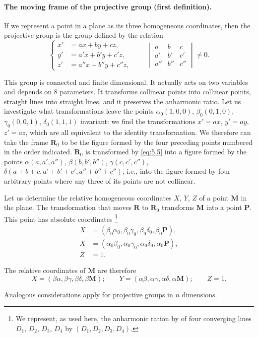 \documentclass[leqno,11pt]{book}
\numberwithin{equation}{chapter}
\theoremstyle{shape1}
\theoremstyle{shapesmall}
\begin{document}
\paragraph{The moving frame of the projective group (first definition).}
\label{sec:66}
If we represent a point in a plane as its three homogeneous coordinates, then the projective group is the group defined by the relation
\begin{equation}
  \label{eq:5.5}
  \left\{
    \begin{aligned}
      x'&=ax+by+cz,\\
      y'&=a'x+b'y+c'z,\\
      z'&=a''x+b''y+c''z,
    \end{aligned}
  \right.\qquad
  \begin{vmatrix}
    a&b&c\\
    a'&b'&c'\\
    a''&b''&c''
  \end{vmatrix}
  \neq 0.
\end{equation}

{\small

This group is connected and finite dimensional. It actually acts on two variables and depends on $8$ parameters. It transforms collinear points into collinear points, straight lines into straight lines, and it preserves the anharmonic ratio. Let us investigate what transformations leave the points $\alpha_{0}(1,0,0)$, $\beta_{0}(0,1,0)$, $\gamma_{0}(0,0,1)$, $\delta_{0}(1,1,1)$ invariant: we find the transformations $x'=ax$, $y'=ay$, $z'=az$, which are all equivalent to the identity transformation. We therefore can take the frame $\mathbf{R}_{0}$ to be the figure formed by the four preceding points numbered in the order indicated. $\mathbf{R}_{0}$ is transformed by \eqref{eq:5.5} into a figure formed by the points $\alpha(a,a',a'')$, $\beta(b,b',b'')$, $\gamma(c,c',c'')$, $\delta(a+b+c,a'+b'+c',a''+b''+c'')$, i.e., into the figure formed by four arbitrary points where any three of its points are not collinear.

Let us determine the relative homogeneous coordinates $X$, $Y$, $Z$ of a point $\mathbf{M}$ in the plane. The transformation that moves $\mathbf{R}$ to $\mathbf{R}_{0}$ transforms $\mathbf{M}$ into a point $\mathbf{P}$. This point has absolute coordinates \footnote{We represent, as used here, the anharmonic ration by of four converging lines $D_{1}$, $D_{2}$, $D_{3}$, $D_{4}$ by $(D_{1},D_{2},D_{3},D_{4})$.}
\begin{align*}
  X&=(\beta_{0}\alpha_{0},\beta_{0}\gamma_{0},\beta_{0}\delta_{0},\beta_{0}\mathbf{P}),\\
  X&=(\alpha_{0}\beta_{0},\alpha_{0}\gamma_{0},\alpha_{0}\delta_{0},\alpha_{0}\mathbf{P}),\\
  Z&=1.
\end{align*}

The relative coordinates of $\mathbf{M}$ are therefore
\[
X=(\beta\alpha,\beta\gamma,\beta\delta,\beta\mathbf{M});\qquad Y=(\alpha\beta,\alpha\gamma,\alpha\delta,\alpha\mathbf{M});\qquad Z=1.
\]

Analogous considerations apply for projective groups in $n$ dimensions.}
\end{document}
